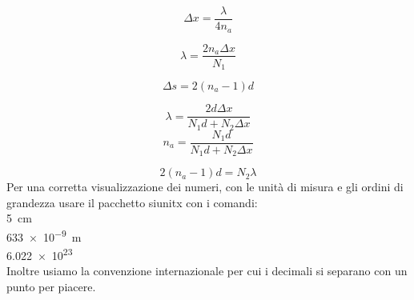 \documentclass[a4paper,11pt]{article}
\begin{document}
	\label{interf} %
	\label{strum} %
	\label{calib} %
	
	\begin{equation}\label{delta}
	\Delta x = \dfrac{\lambda}{4n_a}
	\end{equation}
	
	\begin{equation}\label{lambdana}
	\lambda=\dfrac{2n_a\Delta x}{N_1}		
	\end{equation}
	
	\begin{equation}\label{deltavuoto}
	\Delta s = 2(n_a-1)d
	\end{equation}
	
	\begin{equation}\label{lambda}
	\lambda=\dfrac{2d\Delta x}{N_1 d + N_2 \Delta x}
	\end{equation}
	\begin{equation}\label{na}
	n_a=\dfrac{N_1 d}{N_1 d + N_2 \Delta x}
	\end{equation}
	
	\begin{equation}\label{indice_aria}
	2 (n_a - 1) d = N_2 \lambda
	\end{equation}
	Per una corretta visualizzazione dei numeri, con le unità di misura e gli ordini di grandezza usare il pacchetto siunitx con i comandi:\\
	
		\SI{5}{\centi\meter}
	\\
		\SI{633e-9}{\meter}
	\\
		\num{6.022e23}
	\\
	Inoltre usiamo la convenzione internazionale per cui i decimali si separano con un punto per piacere.
	

	
\end{document}
